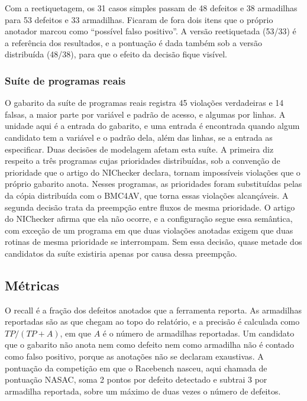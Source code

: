 Com a reetiquetagem, os 31 casos simples passam de 48 defeitos e 38 armadilhas
para 53 defeitos e 33 armadilhas. Ficaram de fora dois itens que o próprio
anotador marcou como ``possível falso positivo''. A versão reetiquetada (53/33)
é a referência dos resultados, e a pontuação é dada também sob a versão
distribuída (48/38), para que o efeito da decisão fique visível.

\subsubsection{Suíte de programas reais}

O gabarito da suíte de programas reais registra 45 violações verdadeiras e 14
falsas, a maior parte por variável e padrão de acesso, e algumas por linhas. A
unidade aqui é a entrada do gabarito, e uma entrada é encontrada quando algum
candidato tem a variável e o padrão dela, além das linhas, se a entrada as
especificar. Duas decisões de modelagem afetam esta suíte. A primeira diz
respeito a três programas cujas prioridades distribuídas, sob a convenção de
prioridade que o artigo do NIChecker declara, tornam impossíveis violações que
o próprio gabarito anota. Nesses programas, as prioridades foram substituídas
pelas da cópia distribuída com o BMC4AV, que torna essas violações alcançáveis.
A segunda decisão trata da preempção entre fluxos de mesma
prioridade. O artigo do NIChecker afirma que ela não ocorre, e a configuração
segue essa semântica, com exceção de um programa em que duas violações anotadas
exigem que duas rotinas de mesma prioridade se interrompam. Sem essa decisão,
quase metade dos candidatos da suíte existiria apenas por causa dessa
preempção.

\subsection{Métricas}

O recall é a fração dos defeitos anotados que a ferramenta reporta. As
armadilhas reportadas são as que chegam ao topo do relatório, e a precisão é
calculada como $TP / (TP + A)$, em que $A$ é o número de armadilhas
reportadas. Um candidato que o gabarito não anota nem como defeito nem como
armadilha não é contado como falso positivo, porque as anotações não se
declaram exaustivas. A pontuação da competição em que o Racebench nasceu, aqui
chamada de pontuação NASAC, soma 2 pontos por defeito detectado e subtrai 3 por
armadilha reportada, sobre um máximo de duas vezes o número de defeitos.

